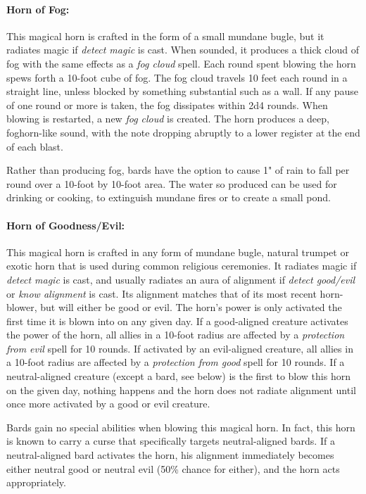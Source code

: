 \begin{multicols}{2}
\paragraph{Horn of Fog:} This magical horn is crafted in the form of a small mundane bugle, but it radiates magic if \textit{detect magic} is cast. When sounded, it produces a thick cloud of fog with the same effects as a \textit{fog cloud} spell.  Each round spent blowing the horn spews forth a 10-foot cube of fog.  The fog cloud travels 10 feet each round in a straight line, unless blocked by something substantial such as a wall.  If any pause of one round or more is taken, the fog dissipates within 2d4 rounds.  When blowing is restarted, a new \textit{fog cloud} is created.  The horn produces a deep, foghorn-like sound, with the note dropping abruptly to a lower register at the end of each blast.  

Rather than producing fog, bards have the option to cause 1" of rain to fall per round over a 10-foot by 10-foot area.  The water so produced can be used for drinking or cooking, to extinguish mundane fires or to create a small pond.

\paragraph{Horn of Goodness/Evil:} This magical horn is crafted in any form of mundane bugle, natural trumpet or exotic horn that is used during common religious ceremonies.  It radiates magic if \textit{detect magic} is cast, and usually radiates an aura of alignment if \textit{detect good/evil} or \textit{know alignment} is cast.  Its alignment matches that of its most recent horn-blower, but will either be good or evil.  The horn's power is only activated the first time it is blown into on any given day.  If a good-aligned creature activates the power of the horn, all allies in a 10-foot radius are affected by a \textit{protection from evil} spell for 10 rounds.  If activated by an evil-aligned creature, all allies in a 10-foot radius are affected by a \textit{protection from good} spell for 10 rounds.  If a neutral-aligned creature (except a bard, see below) is the first to blow this horn on the given day, nothing happens and the horn does not radiate alignment until once more activated by a good or evil creature.

Bards gain no special abilities when blowing this magical horn.  In fact, this horn is known to carry a curse that specifically targets neutral-aligned bards.  If a neutral-aligned bard activates the horn, his alignment immediately becomes either neutral good or neutral evil (50\% chance for either), and the horn acts appropriately.


\end{multicols}
